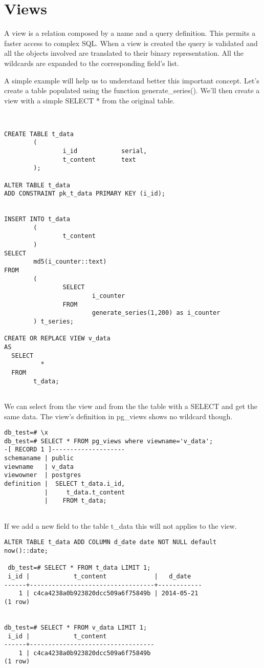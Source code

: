 \section{Views}
\label{sec:VIEWS}
A view is a relation composed by a name and a query definition. This permits a faster access to complex
SQL. When a view is created the query is validated and all the objects involved are translated to their
binary representation. All the wildcards are expanded to the corresponding field's list.\newline

A simple example will help us to understand better this important concept. Let's create a table
populated using the function generate\_series(). We'll then create a view with a simple SELECT * from the
original table.

\begin{lstlisting}[style=pgsql]


CREATE TABLE t_data
        (
                i_id            serial,
                t_content       text
        );

ALTER TABLE t_data
ADD CONSTRAINT pk_t_data PRIMARY KEY (i_id);


INSERT INTO t_data
        (
                t_content
        )
SELECT
        md5(i_counter::text)
FROM
        (
                SELECT
                        i_counter
                FROM
                        generate_series(1,200) as i_counter
        ) t_series;

CREATE OR REPLACE VIEW v_data
AS
  SELECT
          *
  FROM
        t_data;


\end{lstlisting}

We can select from the view and from the the table with a SELECT and get the same data. The view's
definition in pg\_views shows no wildcard though.


\begin{lstlisting}[style=pgsql]
db_test=# \x
db_test=# SELECT * FROM pg_views where viewname='v_data';
-[ RECORD 1 ]--------------------
schemaname | public
viewname   | v_data
viewowner  | postgres
definition |  SELECT t_data.i_id,
           |     t_data.t_content
           |    FROM t_data;


\end{lstlisting}

If we add a new field to the table t\_data this will not applies to the view.

\begin{lstlisting}[style=pgsql]
 ALTER TABLE t_data ADD COLUMN d_date date NOT NULL default now()::date;

 db_test=# SELECT * FROM t_data LIMIT 1;
 i_id |            t_content             |   d_date
------+----------------------------------+------------
    1 | c4ca4238a0b923820dcc509a6f75849b | 2014-05-21
(1 row)


db_test=# SELECT * FROM v_data LIMIT 1;
 i_id |            t_content
------+----------------------------------
    1 | c4ca4238a0b923820dcc509a6f75849b
(1 row)



\end{lstlisting}

